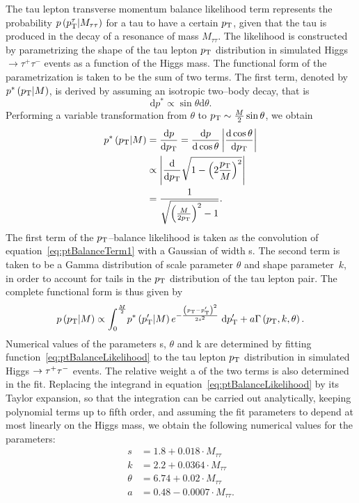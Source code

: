 The tau lepton transverse momentum balance likelihood term represents the
probability $p \left( p_{\mathrm{T}}^{\tau} | M_{\tau\tau} \right)$ for a tau to have a
certain $p_{\mathrm{T}}$, given that the tau is produced in the decay of a resonance of
mass $M_{\tau\tau}$.  The likelihood is constructed by parametrizing the shape
of the tau lepton $p_{\mathrm{T}}$ distribution in simulated Higgs $\to \tau^{+}
\tau^{-}$ events as a function of the Higgs mass.  The functional form of the
parametrization is taken to be the sum of two terms.  The first term, denoted by
$p^{*} \left( p_{\mathrm{T}} | M \right)$, is derived by assuming an isotropic two--body
decay, that is
\begin{equation*}
\mathrm{d}p^{*} \propto \sin\theta \mathrm{d}\theta.
\end{equation*}
Performing a variable transformation from $\theta$ to $p_{\mathrm{T}} \sim \frac{M}{2}
\sin\theta$, we obtain
\begin{align}
p^{*} \left( p_{\mathrm{T}} | M \right) &= \frac{\mathrm{d}p}{\mathrm{d}p_{\mathrm{T}}} = \frac{\mathrm{d}p}{\mathrm{d}\cos\theta}
\left| \frac{\mathrm{d}\cos\theta}{\mathrm{d}p_{\mathrm{T}}} \right| \nonumber \\
&\propto \left| \frac{\mathrm{d}}{\mathrm{d}p_{\mathrm{T}}} \sqrt{1 - \left(2 \frac{p_{\mathrm{T}}}{M} \right)^2} \right| \nonumber \\
&= \frac{1}{\sqrt{\left( \frac{M}{2 p_{\mathrm{T}}} \right)^2 - 1}}. 
\label{eq:ptBalanceTerm1}
\end{align}
The first term of the $p_{\mathrm{T}}$--balance likelihood is taken as the convolution of
equation~\ref{eq:ptBalanceTerm1} with a Gaussian of width s.  The second term is
taken to be a Gamma distribution of scale parameter $\theta$ and shape
parameter~$k$, in order to account for tails in the $p_{\mathrm{T}}$ distribution of the
tau lepton pair.  The complete functional form is thus given by
\begin{equation}
p \left( p_{\mathrm{T}} | M \right) \propto \int_0^{\frac{M}{2}} \! p^* \left( p_{\mathrm{T}}' | M \right) 
 e^{-\frac{\left( p_{\mathrm{T}} - p_{\mathrm{T}}' \right)^2}{2 s^2}} \; \mathrm{d}p_{\mathrm{T}}' + a \Gamma \left( p_{\mathrm{T}}, k, \theta \right).
\label{eq:ptBalanceLikelihood}
\end{equation}
Numerical values of the parameters s, $\theta$ and k are determined by fitting
function~\ref{eq:ptBalanceLikelihood} to the tau lepton $p_{\mathrm{T}}$ distribution in
simulated Higgs $\to\tau^+\tau^-$ events.  The relative weight a of the
two terms is also determined in the fit.  Replacing the integrand in
equation~\ref{eq:ptBalanceLikelihood} by its Taylor expansion, so that the
integration can be carried out analytically, keeping polynomial terms up to
fifth order, and assuming the fit parameters to depend at most linearly on the
Higgs mass, we obtain the following numerical values for the parameters:
\begin{align}
s &= 1.8 + 0.018 \cdot M_{\tau\tau} \nonumber \\
k &= 2.2 + 0.0364 \cdot M_{\tau\tau} \nonumber \\
\theta &= 6.74 + 0.02 \cdot M_{\tau\tau} \nonumber \\
a &= 0.48 - 0.0007 \cdot M_{\tau\tau}. \nonumber 
\end{align}

